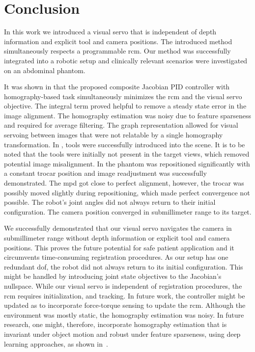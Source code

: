 \section{Conclusion}
\label{c2:sec:conclusions}
In this work we introduced a visual servo that is independent of depth information and explicit tool and camera positions. The introduced method simultaneously respects a programmable \acrshort{rcm}. Our method was successfully integrated into a robotic setup and clinically relevant scenarios were investigated on an abdominal phantom.

It was shown in  that the proposed composite Jacobian PID controller with homography-based task simultaneously minimizes the \acrshort{rcm} and the visual servo objective. The integral term proved helpful to remove a steady state error in the image alignment. The homography estimation was noisy due to feature sparseness and required for average filtering. The graph representation allowed for visual servoing between images that were not relatable by a single homography transformation. In , tools were successfully introduced into the scene. It is to be noted that the tools were initially not present in the target views, which removed potential image misalignment. In  the phantom was repositioned significantly with a constant trocar position and image readjustment was successfully demonstrated. The \acrshort{mpd} got close to perfect alignment, however, the trocar was possibly moved slightly during repositioning, which made perfect convergence not possible. The robot's joint angles did not always return to their initial configuration. The camera position converged in submillimeter range to its target.

We successfully demonstrated that our visual servo navigates the camera in submillimeter range without depth information or explicit tool and camera positions. This proves the future potential for safe patient application and it circumvents time-consuming registration procedures. As our setup has one redundant \acrshort{dof}, the robot did not always return to its initial configuration. This might be handled by introducing joint state objectives to the Jacobian's nullspace. While our visual servo is independent of registration procedures, the \acrshort{rcm} requires initialization, and tracking. In future work, the controller might be updated as to incorporate force-torque sensing to update the \acrshort{rcm}. Although the environment was mostly static, the homography estimation was noisy. In future research, one might, therefore, incorporate homography estimation that is invariant under object motion and robust under feature sparseness, using deep learning approaches, as shown in~\cite{huber2022deep}.

